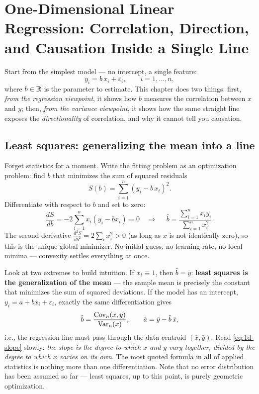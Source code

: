 \section[One dimension: correlation, direction, and causation]{One-Dimensional Linear Regression: Correlation, Direction, and Causation Inside a Single Line}\label{sec:onedim}

Start from the simplest model --- no intercept, a single feature:
\begin{equation}\label{eq:1d-model}
  y_i = b\, x_i + \varepsilon_i, \qquad i = 1, \dots, n,
\end{equation}
where $b \in \mathbb{R}$ is the parameter to estimate. This chapter does two things: first, \textit{from the regression viewpoint}, it shows how $b$ measures the correlation between $x$ and $y$; then, \textit{from the variance viewpoint}, it shows how the same straight line exposes the \textit{directionality} of correlation, and why it cannot tell you causation.

\subsection{Least squares: generalizing the mean into a line}\label{sec:1d-ls}

Forget statistics for a moment. Write the fitting problem as an optimization problem: find $b$ that minimizes the sum of squared residuals
\begin{equation}\label{eq:1d-rss}
  S(b) = \sum_{i=1}^n (y_i - b\, x_i)^2 .
\end{equation}
Differentiate with respect to $b$ and set to zero:
\[
  \frac{dS}{db} = -2 \sum_{i=1}^n x_i (y_i - b x_i) = 0
  \quad\Longrightarrow\quad
  \boxed{\;\hat{b} = \frac{\sum_{i=1}^n x_i y_i}{\sum_{i=1}^n x_i^2}\;}
\]
The second derivative $\frac{d^2 S}{db^2} = 2 \sum_i x_i^2 > 0$ (as long as $x$ is not identically zero), so this is the unique global minimizer. No initial guess, no learning rate, no local minima --- convexity settles everything at once.

Look at two extremes to build intuition. If $x_i \equiv 1$, then $\hat{b} = \bar{y}$: \textbf{least squares is the generalization of the mean} --- the sample mean is precisely the constant that minimizes the sum of squared deviations. If the model has an intercept, $y_i = a + b x_i + \varepsilon_i$, exactly the same differentiation gives
\begin{equation}\label{eq:1d-slope}
  \hat{b} = \frac{\mathrm{Cov}_n(x, y)}{\mathrm{Var}_n(x)}, \qquad \hat{a} = \bar{y} - \hat{b}\,\bar{x},
\end{equation}
i.e., the regression line must pass through the data centroid $(\bar{x}, \bar{y})$. Read \eqref{eq:1d-slope} slowly: \textit{the slope is the degree to which $x$ and $y$ vary together, divided by the degree to which $x$ varies on its own}. The most quoted formula in all of applied statistics is nothing more than one differentiation. Note that no error distribution has been assumed so far --- least squares, up to this point, is purely geometric optimization.

